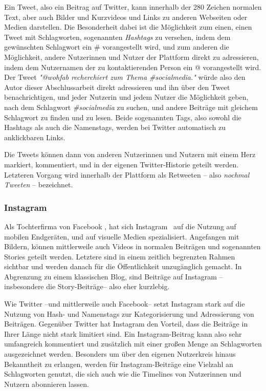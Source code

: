 Ein Tweet, also ein Beitrag auf Twitter, kann innerhalb der 280 Zeichen normalen Text, aber auch Bilder und Kurzvideos und Links zu anderen Webseiten oder Medien darstellen. Die Besonderheit dabei ist die Möglichkeit zum einen, einen Tweet mit Schlagworten, sogenannten \textit{Hashtags} zu versehen, indem dem gewünschten Schlagwort ein \# vorangestellt wird, und zum anderen die Möglichkeit, andere Nutzerinnen und Nutzer der Plattform direkt zu adressieren, indem dem Nutzernamen der zu kontaktierenden Person ein @ vorangestellt wird. Der Tweet \textit{"@wohfab recherchiert zum Thema \#socialmedia."} würde also den Autor dieser Abschlussarbeit direkt adressieren und ihn über den Tweet benachrichtigen, und jeder Nutzerin und jedem Nutzer die Möglichkeit geben, nach dem Schlagwort \textit{\#socialmedia} zu suchen, und andere Beiträge mit gleichem Schlagwort zu finden und zu lesen. Beide sogenannten Tags, also sowohl die Hashtags als auch die Namenstags, werden bei Twitter automatisch zu anklickbaren Links.

Die Tweets können dann von anderen Nutzerinnen und Nutzern mit einem Herz markiert, kommentiert, und in der eigenen Twitter-Historie geteilt werden. Letzteren Vorgang wird innerhalb der Plattform als Retweeten -- also \textit{nochmal Tweeten} -- bezeichnet.

\subsubsection{Instagram}

Als Tochterfirma von Facebook \cite{instagramtou}, hat sich Instagram \faInstagram\ auf die Nutzung auf mobilen Endgeräten, und auf visuelle Medien spezialisiert. Angefangen mit Bildern, können mittlerweile auch Videos in normalen Beiträgen und sogenannten Stories geteilt werden. Letztere sind in einem zeitlich begrenzten Rahmen sichtbar und werden danach für die Öffentlichkeit unzugänglich gemacht. In Abgrenzung zu einem klassischen Blog, sind Beiträge auf Instagram --insbesondere die Story-Beiträge-- also eher kurzlebig.

Wie Twitter --und mittlerweile auch Facebook-- setzt Instagram stark auf die Nutzung von Hash- und Namenstags zur Kategorisierung und Adressierung von Beiträgen. Gegenüber Twitter hat Instagram den Vorteil, dass die Beiträge in Ihrer Länge nicht stark limitiert sind. Ein Instagram-Beitrag kann also sehr umfangreich kommentiert und zusätzlich mit einer großen Menge an Schlagworten ausgezeichnet werden. Besonders um über den eigenen Nutzerkreis hinaus Bekanntheit zu erlangen, werden für Instagram-Beiträge eine Vielzahl an Schlagworten genutzt, die sich auch wie die Timelines von Nutzerinnen und Nutzern abonnieren lassen.

